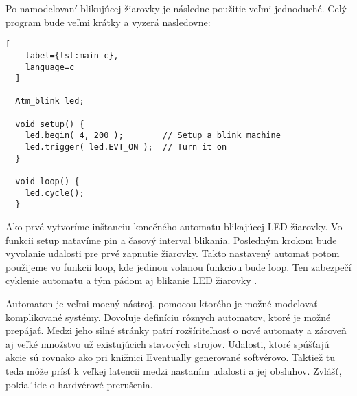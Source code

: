 \par Po namodelovaní blikujúcej žiarovky je následne použitie veľmi jednoduché. Celý program bude veľmi krátky a vyzerá nasledovne:
\begin{lstlisting}[
    label={lst:main-c},
    language=c
  ]

  Atm_blink led;

  void setup() {
    led.begin( 4, 200 );        // Setup a blink machine
    led.trigger( led.EVT_ON );  // Turn it on
  }
  
  void loop() {
    led.cycle();
  }
\end{lstlisting}
Ako prvé vytvoríme inštanciu konečného automatu blikajúcej LED žiarovky. Vo funkcii setup natavíme pin a časový interval blikania. Posledným krokom bude vyvolanie udalosti pre prvé zapnutie žiarovky. Takto nastavený automat potom použijeme vo funkcii loop, kde jedinou volanou funkciou bude loop. Ten zabezpečí cyklenie automatu a tým pádom aj blikanie LED žiarovky \cite{tinkerspyAutomaton2021}.
\par Automaton je veľmi mocný nástroj, pomocou ktorého je možné modelovať komplikované systémy. Dovoľuje definíciu rôznych automatov, ktoré je možné prepájať. Medzi jeho silné stránky patrí rozšíriteľnosť o nové automaty a zároveň aj veľké množstvo už existujúcich stavových strojov. Udalosti, ktoré spúšťajú akcie sú rovnako ako pri knižnici Eventually generované softvérovo. Taktiež tu teda môže prísť k veľkej latencii medzi nastaním udalosti a jej obsluhov. Zvlášť, pokiaľ ide o hardvérové prerušenia.